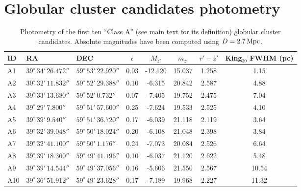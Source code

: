 \documentclass[useAMS,usenatbib]{mn2e}
\begin{document}
\section{Globular cluster candidates photometry}
\label{sec:appendix}
\begin{table}
 \centering
 \caption{Photometry of the first ten ``Class A'' (see main text for its definition) globular cluster candidates. Absolute magnitudes have been computed using $D = 2.7\,\rm{Mpc}$.}
\label{tab:class_a}  
\begin{tabular}{lllccccc}
	\hline
	ID & RA & DEC & $\epsilon$ & $M_{z'}$ & $m_{z'}$ & $r'-z'$ & King$_{30}$ FWHM (pc) \\
	\hline
	A1 & $39^\circ\,34'\,26.472''$ & $59^\circ\,53'\,22.920''$ & 0.03 & -12.120 & 15.037 & 1.258 & 1.15 \\
	A2 & $39^\circ\,32'\,11.832''$ & $59^\circ\,52'\,29.388''$ & 0.10 & -6.315 & 20.842 & 2.587 & 4.88 \\
	A3 & $39^\circ\,33'\,13.680''$ & $59^\circ\,52'\,0.732''$ & 0.07 & -7.405 & 19.752 & 2.475 & 7.04 \\
	A4 & $39^\circ\,29'\,7.800''$ & $59^\circ\,51'\,57.600''$ & 0.25 & -7.624 & 19.533 & 2.525 & 4.10 \\
	A5 & $39^\circ\,39'\,9.540''$ & $59^\circ\,51'\,36.720''$ & 0.17 & -6.039 & 21.118 & 2.119 & 3.64 \\
	A6 & $39^\circ\,32'\,39.048''$ & $59^\circ\,50'\,18.024''$ & 0.20 & -6.108 & 21.048 & 2.398 & 3.84 \\
	A7 & $39^\circ\,32'\,41.100''$ & $59^\circ\,50'\,1.176''$ & 0.24 & -7.073 & 20.084 & 2.526 & 6.64 \\
	A8 & $39^\circ\,39'\,18.360''$ & $59^\circ\,49'\,41.196''$ & 0.10 & -6.037 & 21.120 & 2.622 & 5.48 \\
	A9 & $39^\circ\,39'\,14.544''$ & $59^\circ\,49'\,37.056''$ & 0.16 & -5.606 & 21.550 & 2.567 & 10.54 \\
	A10 & $39^\circ\,36'\,51.912''$ & $59^\circ\,49'\,23.628''$ & 0.17 & -7.189 & 19.968 & 2.227 & 11.32 \\
	\hline
\end{tabular}
\end{table}
\end{document}
